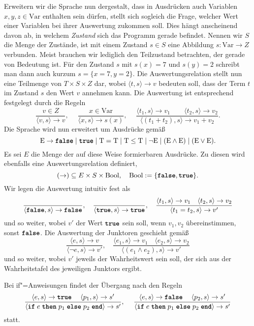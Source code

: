 Erweitern wir die Sprache nun dergestalt, dass in Ausdrücken auch
Variablen $x,y,z\in\mathrm{Var}$ enthalten sein dürfen, stellt sich
sogleich die Frage, welcher Wert einer Variablen bei ihrer Auswertung
zukommen soll. Dies hängt anscheinend davon ab, in welchem \emph{Zustand}
sich das Programm gerade befindet. Nennen wir $S$ die Menge der Zustände,
ist mit einem Zustand $s\in S$ eine Abbildung $s\colon\mathrm{Var}\to Z$
verbunden. Meist brauchen wir lediglich den Teilzustand betrachten, der
gerade von Bedeutung ist. Für den Zustand $s$ mit $s(x)=7$ und $s(y)=2$
schreibt man dann auch kurzum $s=\{x=7,y=2\}$. Die Auswertungsrelation stellt
nun eine Teilmenge von $T\times S\times Z$ dar, wobei $\langle t,s\rangle\to v$
bedeuten soll, dass der Term $t$ im Zustand $s$ den Wert $v$ annehmen
kann. Die Auswertung ist entsprechend festgelegt durch die Regeln
\[\dfrac{v\in Z}{\langle v,s\rangle\to v},\quad\;
\dfrac{x\in\mathrm{Var}}{\langle x,s\rangle\to s(x)},\quad\;
\dfrac{\langle t_1,s\rangle\to v_1\qquad \langle t_2,s\rangle\to v_2}
{\langle (t_1+t_2),s\rangle\to v_1+v_2}.\]
Die Sprache wird nun erweitert um Ausdrücke gemäß
\[\mathrm E \to\kw{false}\mid\kw{true}\mid\mathrm T = \mathrm T\mid
\mathrm T \le \mathrm T\mid \lnot\mathrm E\mid
(\mathrm E\land\mathrm E)\mid (\mathrm E\lor\mathrm E).\]
Es sei $E$ die Menge der auf diese Weise formierbaren Ausdrücke.
Zu diesen wird ebenfalls eine Auswertungsrelation definiert,
\[(\to)\subseteq E\times S\times\mathrm{Bool},\quad
\mathrm{Bool} := \{\kw{false},\kw{true}\}.\]
Wir legen die Auswertung intuitiv fest als
\[\dfrac{}{\langle\kw{false},s\rangle\to\kw{false}},\quad
\dfrac{}{\langle\kw{true},s\rangle\to\kw{true}},\quad
\dfrac{\langle t_1,s\rangle\to v_1\quad\langle t_2,s\rangle\to v_2}
{\langle t_1=t_2, s\rangle\to v'}\]
und so weiter, wobei $v'$ der Wert $\kw{true}$ sein soll, wenn $v_1,v_2$
übereinstimmen, sonst $\kw{false}$. Die Auswertung der Junktoren geschieht gemäß
\[\dfrac{\langle e,s\rangle\to v}{\langle\lnot e,s\rangle\to v'},\quad
\dfrac{\langle e_1,s\rangle\to v_1\quad\langle e_2,s\rangle\to v_2}
{\langle (e_1\land e_2),s\rangle\to v'}\]
und so weiter, wobei $v'$ jeweils der Wahrheitswert sein soll, der
sich aus der Wahrheitstafel des jeweiligen Junktors ergibt.

Bei if"=Anweisungen findet der Übergang nach den Regeln
\[\dfrac{\langle e,s\rangle\to\kw{true}\quad\;\langle p_1,s\rangle\to s'}
{\langle\kw{if}\;e\;\kw{then}\;p_1\;\kw{else}\;p_2\;\kw{end}\rangle\to s'},\quad\;
\dfrac{\langle e,s\rangle\to\kw{false}\quad\;\langle p_2,s\rangle\to s'}
{\langle\kw{if}\;e\;\kw{then}\;p_1\;\kw{else}\;p_2\;\kw{end}\rangle\to s'}\]
statt.

